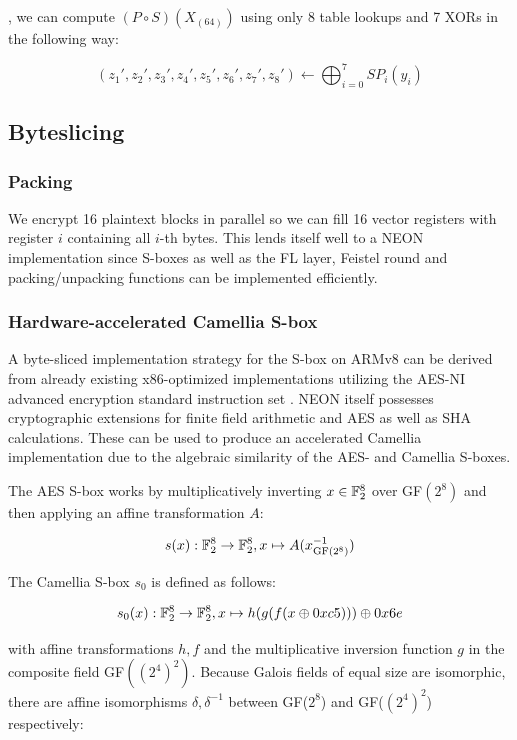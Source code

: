\begin{description}
        , we can compute $(P\circ S)(X_{(64)})$ using only 8 table lookups and 7
        XORs in the following way:

        \[
            (z_1', z_2', z_3', z_4', z_5', z_6', z_7', z_8')\leftarrow\bigoplus_{i=0}^7 SP_i(y_i)
        \]

\end{description}

\subsection{Byteslicing}


\subsubsection{Packing}

We encrypt 16 plaintext blocks in parallel so we can fill 16 vector registers
with register $i$ containing all $i$-th bytes. This lends itself well to a NEON
implementation since S-boxes as well as the FL layer, Feistel round and
packing/unpacking functions can be implemented efficiently.



\subsubsection{Hardware-accelerated Camellia S-box}

A byte-sliced implementation strategy for the S-box on ARMv8 can be derived
from already existing x86-optimized implementations utilizing the AES-NI
advanced encryption standard instruction set \cite{bcfastimplx86:2013}. NEON
itself possesses cryptographic extensions for finite field arithmetic and AES
as well as SHA calculations. These can be used to produce an accelerated
Camellia implementation due to the algebraic similarity of the AES- and
Camellia S-boxes.

The AES S-box works by multiplicatively inverting $x\in\mathbb{F}_2^{8}$ over GF$(2^8)$ and then
applying an affine transformation $A$:

\[
    s(x):\mathbb{F}_2^{8}\rightarrow\mathbb{F}_2^{8}, x\mapsto A(x^{-1}_{\text{GF}(2^8)})
\]

The Camellia S-box $s_0$ is defined as follows:

\[
    s_0(x):\mathbb{F}_2^{8}\rightarrow\mathbb{F}_2^{8}, x\mapsto h(g(f(x\oplus 0xc5)))\oplus 0x6e
\]

with affine transformations $h,f$ and the multiplicative inversion function $g$
in the composite field GF$((2^4)^2)$. Because Galois fields of equal size are
isomorphic, there are affine isomorphisms $\delta,\delta^{-1}$ between
GF($2^8$) and GF($(2^4)^2$) respectively\cite{satohmorioka:2003}:

